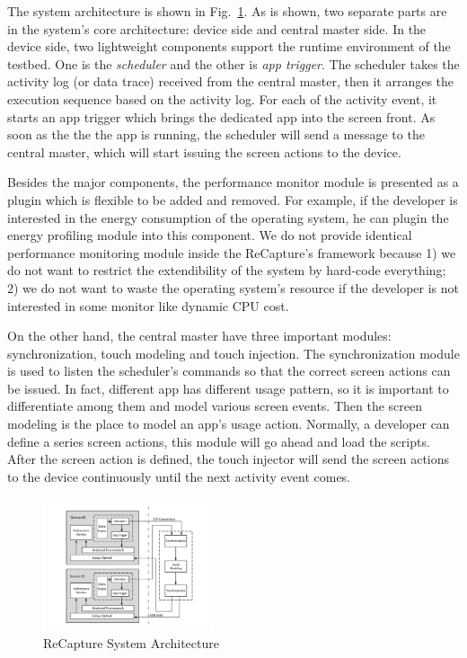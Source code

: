 The system architecture is shown in Fig.~\ref{fig:sys}. As is shown, two separate parts are in the system's core architecture: device side and central master side. In the device side, two lightweight components support the runtime environment of the testbed. One is the \emph{scheduler} and the other is \emph{app trigger}. The scheduler takes the activity log (or data trace) received from the central master, then it arranges the execution sequence based on the activity log. For each of the activity event, it starts an app trigger which brings the dedicated app into the screen front. As soon as the the the app is running, the scheduler will send a message to the central master, which will start issuing the screen actions to the device.

Besides the major components, the performance monitor module is presented as a plugin which is flexible to be added and removed. For example, if the developer is interested in the energy consumption of the operating system, he can plugin the energy profiling module into this component. We do not provide identical performance monitoring module inside the ReCapture's framework because 1) we do not want to restrict the extendibility of the system by hard-code everything; 2) we do not want to waste the operating system's resource if the developer is not interested in some monitor like dynamic CPU cost.

On the other hand, the central master have three important modules: synchronization, touch modeling and touch injection. The synchronization module is used to listen the scheduler's commands so that the correct screen actions can be issued. In fact, different app has different usage pattern, so it is important to differentiate among them and model various screen events. Then the screen modeling is the place to model an app's usage action. Normally, a developer can define a series screen actions, this module will go ahead and load the scripts. After the screen action is defined, the touch injector will send the screen actions to the device continuously until the next activity event comes.

\begin{figure}
\centering
\includegraphics[width=0.45\textwidth]{figures/sys-arch.pdf}
\caption{ReCapture System Architecture}
\label{fig:sys}
\end{figure}

